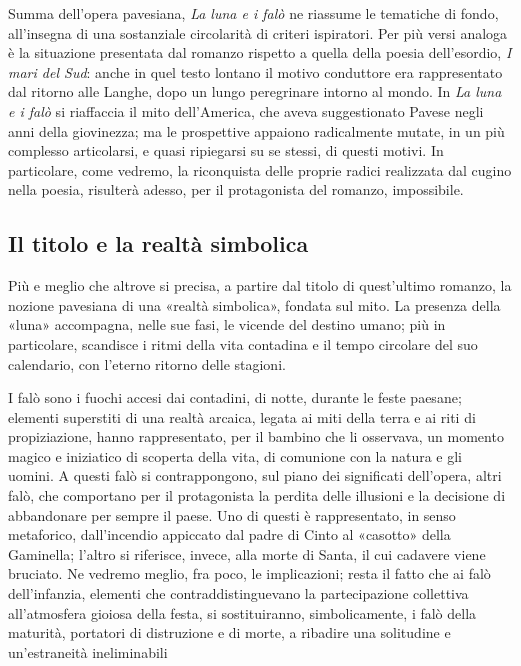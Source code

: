 Summa dell'opera pavesiana, \textit{La luna e i falò} ne riassume le tematiche di fondo, all'insegna di una sostanziale circolarità di criteri ispiratori. Per più versi analoga è la situazione presentata dal romanzo rispetto a quella della poesia dell'esordio, \textit{I mari del Sud}: anche in quel testo lontano il motivo conduttore era rappresentato dal ritorno alle Langhe, dopo un lungo peregrinare intorno al mondo. In \textit{La luna e i falò} si riaffaccia il mito dell'America, che aveva suggestionato Pavese negli anni della giovinezza; ma le prospettive appaiono radicalmente mutate, in un più complesso articolarsi, e quasi ripiegarsi su se stessi, di questi motivi. In particolare, come vedremo, la riconquista delle proprie radici realizzata dal cugino nella poesia, risulterà adesso, per il protagonista del romanzo, impossibile.

\subsection{Il titolo e la realtà simbolica}

Più e meglio che altrove si precisa, a partire dal titolo di quest'ultimo romanzo, la nozione pavesiana di una «realtà simbolica», fondata sul mito. La presenza della «luna» accompagna, nelle sue fasi, le vicende del destino umano; più in particolare, scandisce i ritmi della vita contadina e il tempo circolare del suo calendario, con l'eterno ritorno delle stagioni.

I falò sono i fuochi accesi dai contadini, di notte, durante le feste paesane; elementi superstiti di una realtà arcaica, legata ai miti della terra e ai riti di propiziazione, hanno rappresentato, per il bambino che li osservava, un momento magico e iniziatico di scoperta della vita, di comunione con la natura e gli uomini. A questi falò si contrappongono, sul piano dei significati dell'opera, altri falò, che comportano per il protagonista la perdita delle illusioni e la decisione di abbandonare per sempre il paese. Uno di questi è rappresentato, in senso metaforico, dall'incendio appiccato dal padre di Cinto al «casotto» della Gaminella; l'altro si riferisce, invece, alla morte di Santa, il cui cadavere viene bruciato. Ne vedremo meglio, fra poco, le implicazioni; resta il fatto che ai falò dell'infanzia, elementi che contraddistinguevano la partecipazione collettiva all'atmosfera gioiosa della festa, si sostituiranno, simbolicamente, i falò della maturità, portatori di distruzione e di morte, a ribadire una solitudine e un'estraneità ineliminabili

